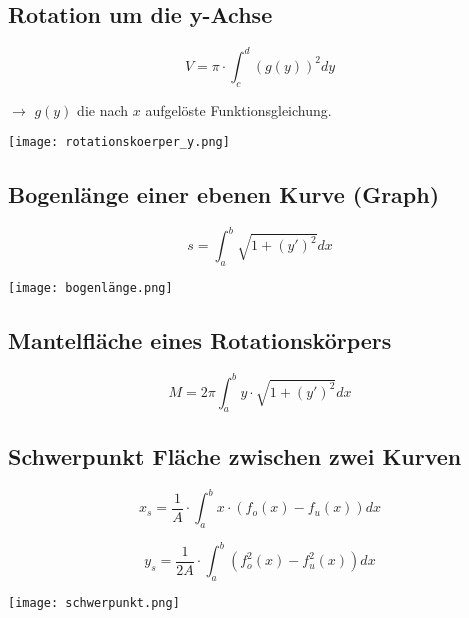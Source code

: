 \begin{multicols*}{3}
    \subsection{Rotation um die y-Achse}

    \begin{multicols}{2}

        {$$V = \pi \cdot \int_{c}^{d}(g(y))^2dy$$}

        $\rightarrow$ $g(y)$ die nach $x$ aufgelöste Funktionsgleichung.

        \columnbreak
        \texttt{[image: rotationskoerper\_y.png]}
    \end{multicols}



    \subsection{Bogenlänge einer ebenen Kurve (Graph)}

    \begin{multicols}{2}

        {$$s = \int_{a}^{b}\sqrt{1+(y')^2}dx$$}

        \columnbreak
        \texttt{[image: bogenlänge.png]}


    \end{multicols}

    \subsection{Mantelfläche eines Rotationskörpers}

    {$$M = 2\pi \int_{a}^{b} y \cdot \sqrt{1+(y')^2}dx$$}

    \subsection{Schwerpunkt Fläche zwischen zwei Kurven}

    \begin{multicols}{2}

        {$$x_s =\frac{1}{A}\cdot \int_{a}^{b}x \cdot(f_o(x)-f_u(x))dx$$}

        {$$y_s =\frac{1}{2A}\cdot \int_{a}^{b}(f_o^2(x)-f_u^2(x))dx$$}

        \columnbreak
        \texttt{[image: schwerpunkt.png]}


    \end{multicols}



\end{multicols*}
